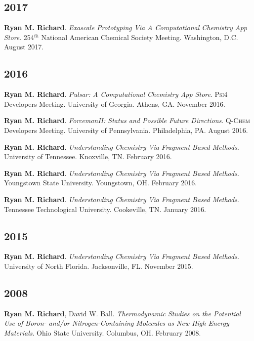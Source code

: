 \documentclass[11pt,a4paper,sans]{moderncv}
\begin{document}
\begin{etaremune}
	\subsection{2017}
	\item{\textbf{Ryan M. Richard}. \textit{Exascale Prototyping Via A
	      Computational Chemistry App Store}. 254$^{th}$ National American
		  Chemical Society Meeting.  Washington, D.C. August 2017.}

	\subsection{2016}
	\item{\textbf{Ryan M. Richard}. \textit{Pulsar: A Computational Chemistry App Store}. \textsc{Psi4} Developers Meeting.  University of Georgia.  Athens, GA.  November 2016.}
	\item{\textbf{Ryan M. Richard}. \textit{ForcemanII: Status and Possible Future Directions}.  \textsc{Q-Chem} Developers Meeting.  University of Pennsylvania. Philadelphia, PA. August 2016.}
	\item{\textbf{Ryan M. Richard}. \textit{Understanding Chemistry Via Fragment Based Methods}. University of Tennessee.  Knoxville, TN.  February 2016.}
	\item{\textbf{Ryan M. Richard}. \textit{Understanding Chemistry Via Fragment Based Methods}. Youngstown State University.  Youngstown, OH.  February 2016.}
	\item{\textbf{Ryan M. Richard}. \textit{Understanding Chemistry Via Fragment Based Methods}. Tennessee Technological University.  Cookeville, TN.  January 2016.}
	\subsection{2015}
	\item{\textbf{Ryan M. Richard}. \textit{Understanding Chemistry Via Fragment Based Methods}. University of North Florida.  Jacksonville, FL.  November 2015.}

	\subsection{2008}
	\item{\textbf{Ryan M. Richard}, David W. Ball. \textit{Thermodynamic Studies on the Potential Use of Boron- and/or Nitrogen-Containing Molecules as New High Energy Materials}. Ohio State University. Columbus, OH. February 2008.}
\end{etaremune}
\end{document}
